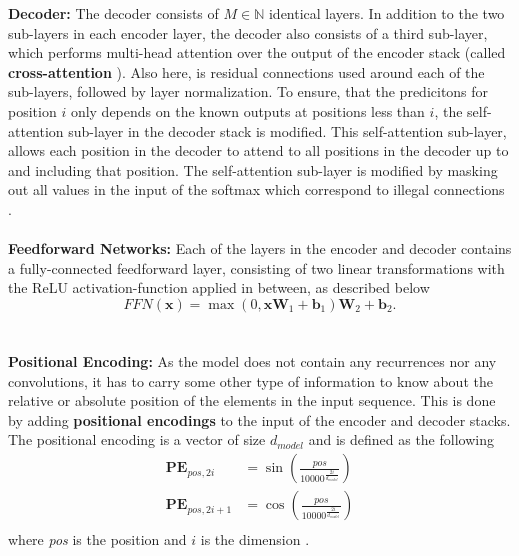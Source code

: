 \documentclass[./main.tex]{subfiles}
\begin{document}
\noindent \textbf{Decoder:} The decoder consists of $M \in \mathbb{N}$ identical layers. In addition to the two sub-layers in each encoder layer, the decoder also consists of a third sub-layer, which performs multi-head attention over the output of the encoder stack (called \textbf{cross-attention} \cite{cross_attention}). Also here, is residual connections used around each of the sub-layers, followed by layer normalization. To ensure, that the predicitons for position $i$ only depends on the known outputs at positions less than $i$, the self-attention sub-layer in the decoder stack is modified. This self-attention sub-layer, allows each position in the decoder to attend to all positions in the decoder up to and including that position. The self-attention sub-layer is modified by masking out all values in the input of the softmax which correspond to illegal connections \cite{https://doi.org/10.48550/arxiv.1706.03762}.
\\
\\
\noindent \textbf{Feedforward Networks:} Each of the layers in the encoder and decoder contains a fully-connected feedforward layer, consisting of two linear transformations with the ReLU activation-function applied in between, as described below \cite{https://doi.org/10.48550/arxiv.1706.03762}
\begin{equation}
    FFN(\bm{x}) = \max \left(0, \bm{x} \bm{W}_1 + \bm{b}_1 \right) \bm{W}_2 + \bm{b}_2.
\end{equation}
\\
\\
\noindent \textbf{Positional Encoding:} As the model does not contain any recurrences nor any convolutions, it has to carry some other type of information to know about the relative or absolute position of the elements in the input sequence. This is done by adding \textbf{positional encodings} to the input of the encoder and decoder stacks. The positional encoding is a vector of size $d_{model}$ and is defined as the following
\begin{align}
    \bm{PE}_{pos, 2i} &= \sin \left( \frac{pos}{10000^{\frac{2i}{d_{model}}}} \right) \\
    \bm{PE}_{pos, 2i + 1} &= \cos \left( \frac{pos}{10000^{\frac{2i}{d_{model}}}} \right) \\
\end{align}
where \textit{pos} is the position and $i$ is the dimension \cite{https://doi.org/10.48550/arxiv.1706.03762}.
\end{document}
